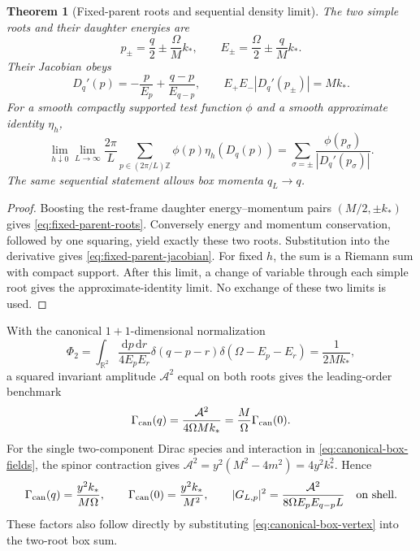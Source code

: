\documentclass[11pt,a4paper,oneside]{book}
\theoremstyle{plain}
\newtheorem{theorem}{Theorem}[chapter]
\theoremstyle{definition}
\theoremstyle{remark}
\newcommand{\R}{\mathbb R}
\newcommand{\Z}{\mathbb Z}
\newcommand{\dd}{\mathrm d}
\newcommand{\src}[2]{\cite{#1}}
\begin{document}
\begin{theorem}[Fixed-parent roots and sequential density limit]
\label{thm:fixed-parent-density}
The two simple roots and their daughter energies are
\begin{equation}
 p_\pm=\frac q2\pm\frac\Omega M k_*,\qquad
 E_\pm=\frac\Omega2\pm\frac qM k_*.
 \label{eq:fixed-parent-roots}
\end{equation}
Their Jacobian obeys
\begin{equation}
 D_q'(p)=-\frac p{E_p}+\frac{q-p}{E_{q-p}},\qquad
 E_+E_-|D_q'(p_\pm)|=Mk_*.
 \label{eq:fixed-parent-jacobian}
\end{equation}
For a smooth compactly supported test function $\phi$ and a smooth
approximate identity $\eta_h$,
\begin{equation}
 \lim_{h\downarrow0}\lim_{L\to\infty}\frac{2\pi}{L}
 \sum_{p\in(2\pi/L)\Z}\phi(p)\eta_h(D_q(p))
 =\sum_{\sigma=\pm}\frac{\phi(p_\sigma)}{|D_q'(p_\sigma)|}.
 \label{eq:fixed-parent-sequential}
\end{equation}
The same sequential statement allows box momenta $q_L\to q$.
\end{theorem}
\begin{proof}
Boosting the rest-frame daughter energy--momentum pairs
$(M/2,\pm k_*)$ gives \eqref{eq:fixed-parent-roots}.  Conversely
energy and momentum conservation, followed by one squaring, yield
exactly these two roots.  Substitution into the derivative gives
\eqref{eq:fixed-parent-jacobian}.  For fixed $h$, the sum is a Riemann
sum with compact support.  After this limit, a change of variable
through each simple root gives the approximate-identity limit.  No
exchange of these two limits is used.
\end{proof}
\src{R20}{thm:v20v42-roots,thm:v20v42-limit}

With the canonical $1+1$-dimensional normalization
\begin{equation}
 \Phi_2=\int_{\R^2}\frac{\dd p\,\dd r}{4E_pE_r}
       \delta(q-p-r)\delta(\Omega-E_p-E_r)=\frac1{2Mk_*},
 \label{eq:canonical-two-body-phase-space}
\end{equation}
a squared invariant amplitude $\mathcal A^2$ equal on both roots gives
the leading-order benchmark
\begin{equation}
 \Gamma_{\rm can}(q)=\frac{\mathcal A^2}{4\Omega Mk_*}
 =\frac M\Omega\Gamma_{\rm can}(0).
 \label{eq:canonical-width}
\end{equation}
For the single two-component Dirac species and interaction in
\eqref{eq:canonical-box-fields}, the spinor contraction gives
$\mathcal A^2=y^2(M^2-4m^2)=4y^2k_*^2$.  Hence
\begin{equation}
 \Gamma_{\rm can}(q)=\frac{y^2k_*}{M\Omega},\qquad
 \Gamma_{\rm can}(0)=\frac{y^2k_*}{M^2},\qquad
 |G_{L,p}|^2=\frac{\mathcal A^2}{8\Omega E_pE_{q-p}L}
 \quad\hbox{on shell}.
 \label{eq:canonical-yukawa-width}
\end{equation}
These factors also follow directly by substituting
\eqref{eq:canonical-box-vertex} into the two-root box sum.
\src{R20}{thm:v20v42-width,thm:v20v42-yukawa,prop:v20v42-box}
\end{document}
